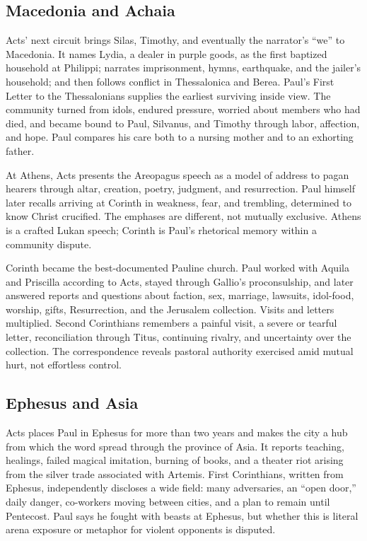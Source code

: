 \subsection{Macedonia and Achaia}

Acts' next circuit brings Silas, Timothy, and eventually the narrator's ``we''
to Macedonia. It names Lydia, a dealer in purple goods, as the first baptized
household at Philippi; narrates imprisonment, hymns, earthquake, and the
jailer's household; and then follows conflict in Thessalonica and Berea.
Paul's First Letter to the Thessalonians supplies the earliest surviving
inside view. The community turned from idols, endured pressure, worried about
members who had died, and became bound to Paul, Silvanus, and Timothy through
labor, affection, and hope. Paul compares his care both to a nursing mother
and to an exhorting father.

At Athens, Acts presents the Areopagus speech as a model of address to pagan
hearers through altar, creation, poetry, judgment, and resurrection. Paul
himself later recalls arriving at Corinth in weakness, fear, and trembling,
determined to know Christ crucified. The emphases are different, not mutually
exclusive. Athens is a crafted Lukan speech; Corinth is Paul's rhetorical
memory within a community dispute.

Corinth became the best-documented Pauline church. Paul worked with Aquila and
Priscilla according to Acts, stayed through Gallio's proconsulship, and later
answered reports and questions about faction, sex, marriage, lawsuits,
idol-food, worship, gifts, Resurrection, and the Jerusalem collection. Visits
and letters multiplied. Second Corinthians remembers a painful visit, a
severe or tearful letter, reconciliation through Titus, continuing rivalry,
and uncertainty over the collection. The correspondence reveals pastoral
authority exercised amid mutual hurt, not effortless control.

\subsection{Ephesus and Asia}

Acts places Paul in Ephesus for more than two years and makes the city a hub
from which the word spread through the province of Asia. It reports teaching,
healings, failed magical imitation, burning of books, and a theater riot
arising from the silver trade associated with Artemis. First Corinthians,
written from Ephesus, independently discloses a wide field: many adversaries,
an ``open door,'' daily danger, co-workers moving between cities, and a plan to
remain until Pentecost. Paul says he fought with beasts at Ephesus, but whether
this is literal arena exposure or metaphor for violent opponents is disputed.

